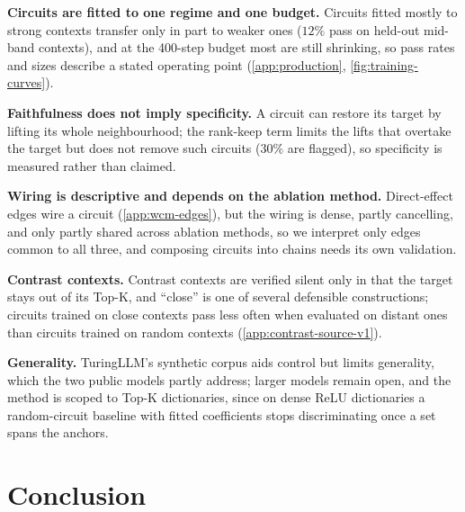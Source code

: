 \documentclass[10pt]{article}
\begin{document}
\textbf{Circuits are fitted to one regime and one budget.}
Circuits fitted mostly to strong contexts transfer only in part to weaker ones ($12\%$ pass on held-out mid-band contexts), and at the 400-step budget most are still shrinking, so pass rates and sizes describe a stated operating point (\cref{app:production}, \cref{fig:training-curves}).

\textbf{Faithfulness does not imply specificity.}
A circuit can restore its target by lifting its whole neighbourhood; the rank-keep term limits the lifts that overtake the target but does not remove such circuits ($30\%$ are flagged), so specificity is measured rather than claimed.

\textbf{Wiring is descriptive and depends on the ablation method.}
Direct-effect edges wire a circuit (\cref{app:wcm-edges}), but the wiring is dense, partly cancelling, and only partly shared across ablation methods, so we interpret only edges common to all three, and composing circuits into chains needs its own validation.

\textbf{Contrast contexts.}
Contrast contexts are verified silent only in that the target stays out of its Top-K, and ``close'' is one of several defensible constructions; circuits trained on close contexts pass less often when evaluated on distant ones than circuits trained on random contexts (\cref{app:contrast-source-v1}).

\textbf{Generality.}
TuringLLM's synthetic corpus aids control but limits generality, which the two public models partly address; larger models remain open, and the method is scoped to Top-K dictionaries, since on dense ReLU dictionaries a random-circuit baseline with fitted coefficients stops discriminating once a set spans the anchors.

\section{Conclusion}
\end{document}
